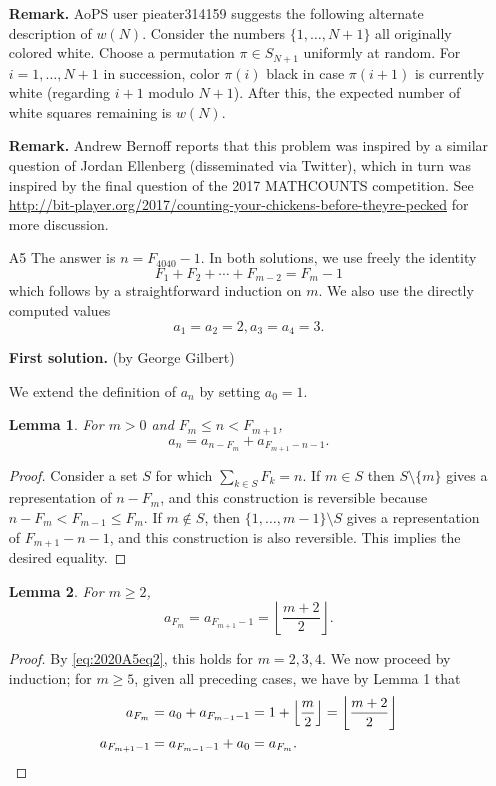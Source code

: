 \documentclass[amssymb,twocolumn,pra,10pt,aps]{revtex4-1}
\newtheorem{lemma}{Lemma}
\begin{document}
\begin{itemize}
\noindent
\textbf{Remark.}
AoPS user pieater314159 suggests the following alternate description of $w(N)$. Consider the numbers $\{1,\dots,N+1\}$ all originally colored white.
Choose a permutation $\pi \in S_{N+1}$ uniformly at random. For $i=1,\dots,N+1$ in succession, color $\pi(i)$ black in case $\pi(i+1)$ is currently white (regarding $i+1$ modulo $N+1$). After this, the expected number of white squares remaining is $w(N)$.

\noindent
\textbf{Remark.}
Andrew Bernoff reports that this problem was inspired by a similar question of Jordan Ellenberg (disseminated via Twitter), which in turn was inspired by the final question of the 2017 MATHCOUNTS competition. See
\url{http://bit-player.org/2017/counting-your-chickens-before-theyre-pecked} for more discussion.

\item[A5]
The answer is $n=F_{4040}-1$. In both solutions, we use freely the identity
\begin{equation} \label{eq:2020A5eq1}
F_1+F_2+\cdots+F_{m-2} = F_m-1
\end{equation}
which follows by a straightforward induction on $m$.
We also use the directly computed values
\begin{equation} \label{eq:2020A5eq2}
a_1 = a_2 = 2, a_3 = a_4 = 3.
\end{equation}

\noindent
\textbf{First solution.} (by George Gilbert)

We extend the definition of $a_n$ by setting $a_0 = 1$.

\setcounter{lemma}{0}
\begin{lemma}
For $m>0$ and $F_m \leq n < F_{m+1}$, 
\begin{equation} \label{eq:2020A5eq3}
a_n = a_{n-F_m} + a_{F_{m+1}-n-1}.
\end{equation}
\end{lemma}
\begin{proof}
Consider a set $S$ for which $\sum_{k \in S} F_k = n$.
If $m \in S$ then $S \setminus \{m\}$ gives a representation of $n-F_m$, and this construction is reversible because $n-F_m < F_{m-1} \leq F_m$.
If $m \notin S$, then $\{1,\dots,m-1\} \setminus S$ gives a representation of $F_{m+1} - n - 1$, and this construction is also reversible.
This implies the desired equality.
\end{proof}

\begin{lemma}
For $m \geq 2$,
\[
a_{F_m} = a_{F_{m+1}-1} = \left\lfloor \frac{m+2}{2} \right\rfloor.
\]
\end{lemma}
\begin{proof}
By \eqref{eq:2020A5eq2}, this holds for $m=2,3,4$. We now proceed by induction; for $m \geq 5$, given all preceding cases,
we have by Lemma 1 that
\begin{align*}
a_{F_m} &= a_0 + a_{F_{m-1}-1} = 1 + \left\lfloor \frac{m}{2} \right\rfloor =  \left\lfloor \frac{m+2}{2} \right\rfloor \\
a_{F_{m+1}-1} &= a_{F_{m-1}-1} + a_0 = a_{F_m}. \qedhere
\end{align*}
\end{proof}


\end{itemize}
\end{document}
